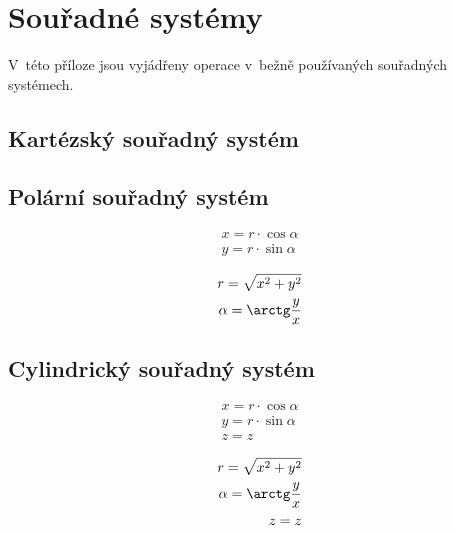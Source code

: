 \chapter{Souřadné systémy}

V~této příloze jsou vyjádřeny operace v~bežně používaných souřadných systémech.

\section{Kartézský souřadný systém}

\section{Polární souřadný systém}

\begin{equation}
\begin{split}
x = r \cdot \cos \alpha \\
y = r \cdot \sin \alpha
\end{split}
\end{equation}

\begin{equation}
\begin{split}
r = \sqrt{x^2 + y^2} \\
\alpha = \arctg \frac{y}{x}
\end{split}
\end{equation}



\section{Cylindrický souřadný systém}

\begin{equation}
\begin{split}
x = r \cdot \cos \alpha \\
y = r \cdot \sin \alpha \\
z = z
\end{split}
\end{equation}

\begin{equation}
\begin{split}
r = \sqrt{x^2 + y^2} \\
\alpha = \arctg \frac{y}{x} \\
z = z
\end{split}
\end{equation}



